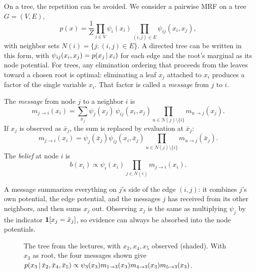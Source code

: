 On a tree, the repetition can be avoided. We consider a pairwise MRF on a tree $G=(V,E)$,
\[
p(x)=\frac1Z\prod_{i\in V}\psi_i(x_i)\prod_{(i,j)\in E}\psi_{ij}(x_i,x_j),
\]
with neighbor sets $N(i)=\{j:(i,j)\in E\}$. A directed tree can be written in this form, with $\psi_{ij}(x_i,x_j)=p(x_j\,|\, x_i)$ for each edge and the root's marginal as its node potential. For trees, any elimination ordering that proceeds from the leaves toward a chosen root is optimal: eliminating a leaf $x_j$ attached to $x_i$ produces a factor of the single variable $x_i$. That factor is called a \emph{message} from $j$ to $i$.

\begin{definition}\label{def:bp-messages}
The \emph{message} from node $j$ to a neighbor $i$ is
\begin{equation}\label{eq:bp-message}
m_{j\to i}(x_i)=\sum_{x_j}\psi_j(x_j)\,\psi_{ij}(x_i,x_j)\prod_{u\in N(j)\setminus\{i\}}m_{u\to j}(x_j).
\end{equation}
If $x_j$ is observed as $\bar x_j$, the sum is replaced by evaluation at $\bar x_j$:
\[
m_{j\to i}(x_i)=\psi_j(\bar x_j)\psi_{ij}(x_i,\bar x_j)\prod_{u\in N(j)\setminus\{i\}}m_{u\to j}(\bar x_j).
\]
The \emph{belief} at node $i$ is
\[
b(x_i)\propto\psi_i(x_i)\prod_{j\in N(i)}m_{j\to i}(x_i).
\]
\end{definition}

A message summarizes everything on $j$'s side of the edge $(i,j)$: it combines $j$'s own potential, the edge potential, and the messages $j$ has received from its other neighbors, and then sums $x_j$ out. Observing $x_j$ is the same as multiplying $\psi_j$ by the indicator $\mathbf{1}[x_j=\bar x_j]$, so evidence can always be absorbed into the node potentials.

\begin{figure}[ht]
\centering
{}
\caption{The tree from the lectures, with $x_2,x_4,x_5$ observed (shaded). With $x_3$ as root, the four messages shown give $p(x_3\,|\,\bar x_2,\bar x_4,\bar x_5)\propto\psi_3(x_3)m_{1\to3}(x_3)m_{4\to3}(x_3)m_{5\to3}(x_3)$.}
\label{fig:bp-tree}
\end{figure}

